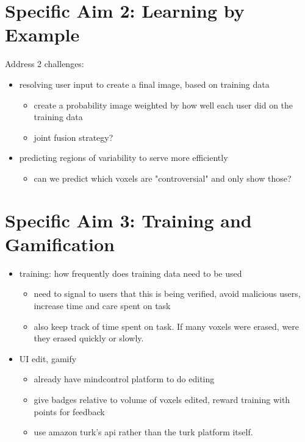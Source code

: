 \section{Specific Aim 2: Learning by Example}

Address 2 challenges:
\begin{itemize}
\item resolving user input to create a final image, based on training data
\begin{itemize}
\item create a probability image weighted by how well each user did on the training data
\item joint fusion strategy?
\end{itemize}
\item predicting regions of variability to serve more efficiently
\begin{itemize}
\item can we predict which voxels are "controversial" and only show those?
\end{itemize}
\end{itemize}

\section{Specific Aim 3: Training and Gamification}
\begin{itemize}
\item training: how frequently does training data need to be used
\begin{itemize}
\item need to signal to users that this is being verified, avoid malicious users, increase time and care spent on task
\item also keep track of time spent on task. If many voxels were erased, were they erased quickly or slowly. 
\end{itemize}
\item UI edit, gamify
\begin{itemize}
\item already have mindcontrol platform to do editing
\item give badges relative to volume of voxels edited, reward training with points for feedback
\item use amazon turk's api rather than the turk platform itself. 
\end{itemize}
\end{itemize}